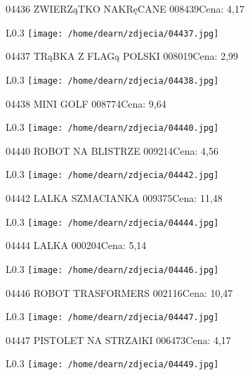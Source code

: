 04436 ZWIERZąTKO NAKRęCANE                            008439Cena: 4,17\newline
\begin{wrapfigure}{L}{0.3\textwidth}
\texttt{[image: /home/dearn/zdjecia/04437.jpg]}
\end{wrapfigure}
04437 TRąBKA Z FLAGą POLSKI                          008019Cena: 2,99\newline
\begin{wrapfigure}{L}{0.3\textwidth}
\texttt{[image: /home/dearn/zdjecia/04438.jpg]}
\end{wrapfigure}
04438 MINI GOLF                                       008774Cena: 9,64\newline
\begin{wrapfigure}{L}{0.3\textwidth}
\texttt{[image: /home/dearn/zdjecia/04440.jpg]}
\end{wrapfigure}
04440 ROBOT NA BLISTRZE                               009214Cena: 4,56\newline
\begin{wrapfigure}{L}{0.3\textwidth}
\texttt{[image: /home/dearn/zdjecia/04442.jpg]}
\end{wrapfigure}
04442 LALKA SZMACIANKA                               009375Cena: 11,48\newline
\begin{wrapfigure}{L}{0.3\textwidth}
\texttt{[image: /home/dearn/zdjecia/04444.jpg]}
\end{wrapfigure}
04444 LALKA                                          000204Cena: 5,14\newline
\begin{wrapfigure}{L}{0.3\textwidth}
\texttt{[image: /home/dearn/zdjecia/04446.jpg]}
\end{wrapfigure}
04446 ROBOT TRASFORMERS                               002116Cena: 10,47\newline
\begin{wrapfigure}{L}{0.3\textwidth}
\texttt{[image: /home/dearn/zdjecia/04447.jpg]}
\end{wrapfigure}
04447 PISTOLET NA STRZAłKI                            006473Cena: 4,17\newline
\begin{wrapfigure}{L}{0.3\textwidth}
\texttt{[image: /home/dearn/zdjecia/04449.jpg]}
\end{wrapfigure}
